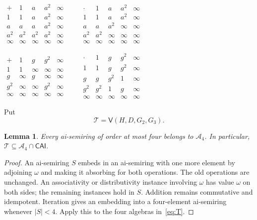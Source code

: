 \documentclass[11pt,reqno]{amsart}
\newtheorem{lemma}[theorem]{Lemma}
\theoremstyle{remark}
\newcommand{\CAI}{\mathsf{CAI}}
\newcommand{\A}{\mathcal A_4}
\newcommand{\T}{\mathcal T}
\newcommand{\V}{\mathsf V}
\numberwithin{equation}{section}
\begin{document}
\begin{table}[htbp]
\caption{The auxiliary semirings $H$ and $G_3$.}\label{tab:aux}
\centering
\renewcommand{\arraystretch}{1.06}
\setlength{\tabcolsep}{6pt}
$\begin{array}{c|cccc}
+&1&a&a^2&\infty\\\hline
1&1&a&a^2&\infty\\
a&a&a&a^2&\infty\\
a^2&a^2&a^2&a^2&\infty\\
\infty&\infty&\infty&\infty&\infty
\end{array}\qquad
\begin{array}{c|cccc}
\cdot&1&a&a^2&\infty\\\hline
1&1&a&a^2&\infty\\
a&a&a^2&\infty&\infty\\
a^2&a^2&\infty&\infty&\infty\\
\infty&\infty&\infty&\infty&\infty
\end{array}$
\par\medskip
$\begin{array}{c|cccc}
+&1&g&g^2&\infty\\\hline
1&1&\infty&\infty&\infty\\
g&\infty&g&\infty&\infty\\
g^2&\infty&\infty&g^2&\infty\\
\infty&\infty&\infty&\infty&\infty
\end{array}\qquad
\begin{array}{c|cccc}
\cdot&1&g&g^2&\infty\\\hline
1&1&g&g^2&\infty\\
g&g&g^2&1&\infty\\
g^2&g^2&1&g&\infty\\
\infty&\infty&\infty&\infty&\infty
\end{array}$
\end{table}

Put
\begin{equation}\label{eq:T}
\T=\V(H,D,G_2,G_3).
\end{equation}

\begin{lemma}\label{lem:inclusion}
Every ai-semiring of order at most four belongs to $\A$. In particular,
$\T\subseteq\A\cap\CAI$.
\end{lemma}
\begin{proof}
An ai-semiring $S$ embeds in an ai-semiring with one more element by
adjoining $\omega$ and making it absorbing for both operations. The old
operations are unchanged. An associativity or distributivity instance
involving $\omega$ has value $\omega$ on both sides; the remaining
instances hold in $S$. Addition remains commutative and idempotent.
Iteration gives an embedding into a four-element ai-semiring whenever
$|S|<4$. Apply this to the four algebras in~\eqref{eq:T}.
\end{proof}
\end{document}
